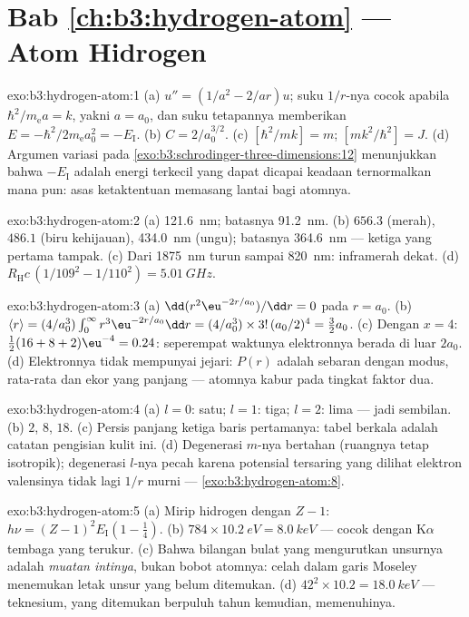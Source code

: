\section*{Bab \ref{ch:b3:hydrogen-atom} --- Atom Hidrogen}

\begin{solution}{exo:b3:hydrogen-atom:1}
(a) $u'' = (1/a^2 - 2/ar)u$; suku $1/r$-nya cocok apabila
$\hbar^2/m_{\text{e}}a = k$, yakni $a = a_0$, dan suku tetapannya
memberikan $E = -\hbar^2/2m_{\text{e}}a_0^2 = -E_{\text{I}}$. (b) $C =
2/a_0^{3/2}$. (c) $[\hbar^2/mk] = \unit{m}$; $[mk^2/\hbar^2] =
\unit{J}$. (d) Argumen variasi pada
\cref{exo:b3:schrodinger-three-dimensions:12} menunjukkan bahwa
$-E_{\text{I}}$ adalah energi terkecil yang dapat dicapai keadaan
ternormalkan mana pun: asas ketaktentuan memasang lantai bagi atomnya.
\end{solution}

\begin{solution}{exo:b3:hydrogen-atom:2}
(a) \qty{121.6}{nm}; batasnya \qty{91.2}{nm}. (b) $656.3$ (merah),
$486.1$ (biru kehijauan), \qty{434.0}{nm} (ungu); batasnya
\qty{364.6}{nm} --- ketiga yang pertama tampak. (c) Dari
\qty{1875}{nm} turun sampai \qty{820}{nm}: inframerah dekat. (d)
$R_{\text{H}}c\,(1/109^2 - 1/110^2) = \qty{5.01}{GHz}$.
\end{solution}

\begin{solution}{exo:b3:hydrogen-atom:3}
(a) $\dd(r^2\eu^{-2r/a_0})/\dd r = 0$ pada $r = a_0$. (b) $\langle r\rangle = (4/a_0^3)\int_0^\infty
r^3\eu^{-2r/a_0}\dd r = (4/a_0^3)\times 3!\,(a_0/2)^4 = \tfrac32
a_0$. (c) Dengan $x = 4$:
$\tfrac12(16 + 8 + 2)\eu^{-4} = 0.24$: seperempat waktunya
elektronnya berada di luar $2a_0$. (d) Elektronnya tidak mempunyai
jejari: $P(r)$ adalah sebaran dengan modus, rata-rata dan ekor yang
panjang --- atomnya kabur pada tingkat faktor dua.
\end{solution}

\begin{solution}{exo:b3:hydrogen-atom:4}
(a) $l = 0$: satu; $l = 1$: tiga; $l = 2$: lima --- jadi sembilan. (b) $2$,
$8$, $18$. (c) Persis panjang ketiga baris pertamanya: tabel berkala
adalah catatan pengisian kulit ini. (d) Degenerasi $m$-nya bertahan
(ruangnya tetap isotropik); degenerasi $l$-nya pecah karena potensial
tersaring yang dilihat elektron valensinya tidak lagi $1/r$ murni ---
\cref{exo:b3:hydrogen-atom:8}.
\end{solution}

\begin{solution}{exo:b3:hydrogen-atom:5}
(a) Mirip hidrogen dengan $Z - 1$: $h\nu = (Z-1)^2E_{\text{I}}(1 -
\tfrac14)$. (b) $784 \times \qty{10.2}{eV} = \qty{8.0}{keV}$ ---
cocok dengan K$\alpha$ tembaga yang terukur. (c) Bahwa bilangan bulat
yang mengurutkan unsurnya adalah \emph{muatan intinya}, bukan bobot
atomnya: celah dalam garis Moseley menemukan letak unsur yang belum
ditemukan. (d)
$42^2 \times 10.2 = \qty{18.0}{keV}$ --- teknesium, yang ditemukan
berpuluh tahun kemudian, memenuhinya.
\end{solution}

